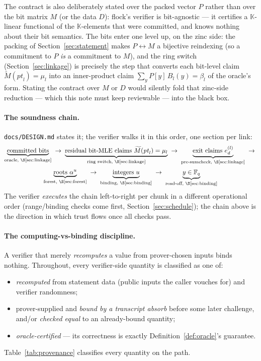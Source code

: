 \documentclass[11pt]{article}
\newcommand{\F}{\mathbb{F}}
\newcommand{\K}{\mathbb{K}}            %
\newcommand{\Fq}{\F_q}                 %
\newcommand{\mle}[1]{\widetilde{#1}}
\newcommand{\code}[1]{{\def\_{\textunderscore\allowbreak}\texttt{#1}}}
\begin{document}
The contract is also deliberately stated over the packed vector $P$
rather than over the bit matrix $M$ (or the data $D$): flock's verifier
is bit-agnostic — it certifies a $\K$-linear functional of the
$\K$-elements that were committed, and knows nothing about their bit
semantics.  The bits enter one level up, on the zinc side: the packing of
Section~\ref{sec:statement} makes $P \leftrightarrow M$ a bijective
reindexing (so a commitment to $P$ \emph{is} a commitment to $M$), and
the ring switch (Section~\ref{sec:linkage}) is precisely the step that
converts each bit-level claim $\mle{M}(\mathit{pt}_l) = \mu_l$ into an
inner-product claim $\sum_y P[y]\, B_l(y) = \beta_l$ of the oracle's
form.  Stating the contract over $M$ or $D$ would silently fold that
zinc-side reduction — which this note must keep reviewable — into the
black box.

\paragraph{The soundness chain.}  \code{docs/DESIGN.md} states it; the
verifier walks it in this order, one section per link:
\begin{gather*}
\underbrace{\text{committed bits}}_{\text{oracle, \S\ref{sec:linkage}}}
\;\to\;
\underbrace{\text{residual bit-MLE claims } \mle{M}(\mathit{pt}_l) = \mu_l}_{\text{ring switch, \S\ref{sec:linkage}}}
\;\to\;
\underbrace{\text{exit claims } e_d^{(l)}}_{\text{pre-sumcheck, \S\ref{sec:linkage}}}
\;\to\; \\[2pt]
\underbrace{\text{roots } \alpha^{u}}_{\text{forest, \S\ref{sec:forest}}}
\;\to\;
\underbrace{\text{integers } u}_{\text{binding, \S\ref{sec:binding}}}
\;\to\;
\underbrace{y \in \Fq}_{\text{read-off, \S\ref{sec:binding}}}
\end{gather*}
The verifier \emph{executes} the chain left-to-right per chunk in a
different operational order (range/binding checks come first,
Section~\ref{sec:schedule}); the chain above is the direction in which
trust flows once all checks pass.

\paragraph{The computing-vs-binding discipline.}  A verifier that merely
\emph{recomputes} a value from prover-chosen inputs binds nothing.
Throughout, every verifier-side quantity is classified as one of:
\begin{itemize}[itemsep=1pt]
\item[\textbf{(R)}] \emph{recomputed} from statement data (public inputs
  the caller vouches for) and verifier randomness;
\item[\textbf{(A)}] prover-supplied and \emph{bound by a transcript
  absorb} before some later challenge, and/or \emph{checked equal} to an
  already-bound quantity;
\item[\textbf{(O)}] \emph{oracle-certified} — its correctness is exactly
  Definition~\ref{def:oracle}'s guarantee.
\end{itemize}
Table~\ref{tab:provenance} classifies every quantity on the path.
\end{document}
